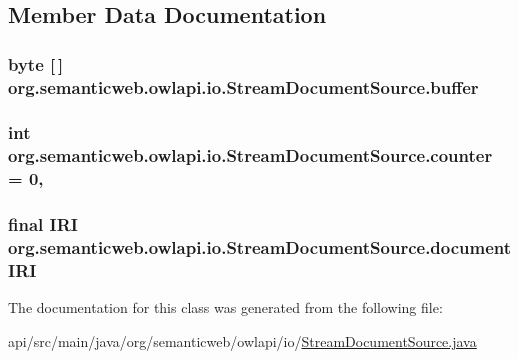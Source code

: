 \subsection{Member Data Documentation}
\hypertarget{classorg_1_1semanticweb_1_1owlapi_1_1io_1_1_stream_document_source_aa03542598b0a230911b3e8e739746c4a}{
\subsubsection[{buffer}]{\setlength{\rightskip}{0pt plus 5cm}byte \mbox{[}$\,$\mbox{]} org.\-semanticweb.\-owlapi.\-io.\-Stream\-Document\-Source.\-buffer\hspace{0.3cm}{\ttfamily [private]}}}\label{classorg_1_1semanticweb_1_1owlapi_1_1io_1_1_stream_document_source_aa03542598b0a230911b3e8e739746c4a}
\hypertarget{classorg_1_1semanticweb_1_1owlapi_1_1io_1_1_stream_document_source_aea84bd7041ae30d6a90689cace5333a4}{
\subsubsection[{counter}]{\setlength{\rightskip}{0pt plus 5cm}int org.\-semanticweb.\-owlapi.\-io.\-Stream\-Document\-Source.\-counter = 0\hspace{0.3cm}{\ttfamily [static]}, {\ttfamily [private]}}}\label{classorg_1_1semanticweb_1_1owlapi_1_1io_1_1_stream_document_source_aea84bd7041ae30d6a90689cace5333a4}
\hypertarget{classorg_1_1semanticweb_1_1owlapi_1_1io_1_1_stream_document_source_a86e12cbfa2b87e56537fe5b28d100eb0}{
\subsubsection[{document\-I\-R\-I}]{\setlength{\rightskip}{0pt plus 5cm}final {\bf I\-R\-I} org.\-semanticweb.\-owlapi.\-io.\-Stream\-Document\-Source.\-document\-I\-R\-I\hspace{0.3cm}{\ttfamily [private]}}}\label{classorg_1_1semanticweb_1_1owlapi_1_1io_1_1_stream_document_source_a86e12cbfa2b87e56537fe5b28d100eb0}


The documentation for this class was generated from the following file\-:\begin{DoxyCompactItemize}
\item 
api/src/main/java/org/semanticweb/owlapi/io/\hyperlink{_stream_document_source_8java}{Stream\-Document\-Source.\-java}\end{DoxyCompactItemize}
